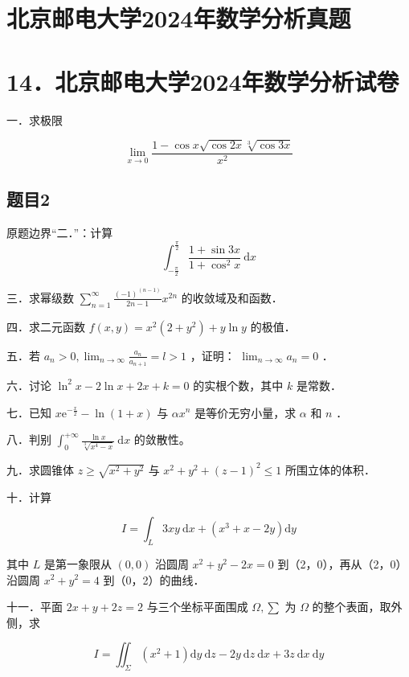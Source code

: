 \documentclass{article}
\begin{document}
\section*{北京邮电大学2024年数学分析真题}
\section*{14．北京邮电大学2024年数学分析试卷}
一．求极限

\[
\lim _{x \rightarrow 0} \frac{1-\cos x \sqrt{\cos 2 x} \sqrt[3]{\cos 3 x}}{x^{2}}
\]

\begin{itemize}
\end{itemize}

\subsection{题目2}
原题边界“二．”：计算
\[
\int_{-\frac{\pi}{2}}^{\frac{\pi}{2}} \frac{1+\sin 3 x}{1+\cos ^{2} x} \mathrm{~d} x
\]

三．求幂级数 \(\sum_{n=1}^{\infty} \frac{(-1)^{(n-1)}}{2 n-1} x^{2 n}\) 的收敛域及和函数．

四．求二元函数 \(f(x, y)=x^{2}\left(2+y^{2}\right)+y \ln y\) 的极值．

五．若 \(a_{n}>0, \lim _{n \rightarrow \infty} \frac{a_{n}}{a_{n+1}}=l>1\) ，证明： \(\lim _{n \rightarrow \infty} a_{n}=0\) ．

六．讨论 \(\ln ^{2} x-2 \ln x+2 x+k=0\) 的实根个数，其中 \(k\) 是常数．

七．已知 \(x \mathrm{e}^{-\frac{x}{2}}-\ln (1+x)\) 与 \(\alpha x^{n}\) 是等价无穷小量，求 \(\alpha\) 和 \(n\) ．

八．判别 \(\int_{0}^{+\infty} \frac{\ln x}{\sqrt[3]{x^{4}-x}} \mathrm{~d} x\) 的敛散性。

九．求圆锥体 \(z \geq \sqrt{x^{2}+y^{2}}\) 与 \(x^{2}+y^{2}+(z-1)^{2} \leq 1\) 所围立体的体积．

十．计算

\[
I=\int_{L} 3 x y \mathrm{~d} x+\left(x^{3}+x-2 y\right) \mathrm{d} y
\]

其中 \(L\) 是第一象限从 \((0,0)\) 沿圆周 \(x^{2}+y^{2}-2 x=0\) 到（2，0），再从（2，0）沿圆周 \(x^{2}+y^{2}=4\) 到（0，2）的曲线．

十一．平面 \(2 x+y+2 z=2\) 与三个坐标平面围成 \(\Omega, \sum\) 为 \(\Omega\) 的整个表面，取外侧，求

\[
I=\iint_{\Sigma}\left(x^{2}+1\right) \mathrm{d} y \mathrm{~d} z-2 y \mathrm{~d} z \mathrm{~d} x+3 z \mathrm{~d} x \mathrm{~d} y
\]
\end{document}
